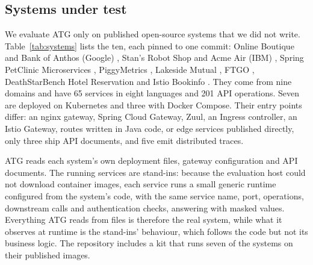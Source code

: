 \documentclass[conference]{IEEEtran}
\begin{document}
\subsection{Systems under test}
We evaluate ATG only on published open-source systems that we did not write. Table~\ref{tab:systems} lists the ten, each pinned to one commit: Online Boutique and Bank of Anthos (Google) \cite{boutique,anthos}, Stan's Robot Shop and Acme Air (IBM) \cite{robotshop,acmeair}, Spring PetClinic Microservices \cite{petclinic}, PiggyMetrics \cite{piggymetrics}, Lakeside Mutual \cite{lakeside}, FTGO \cite{ftgo}, DeathStarBench Hotel Reservation \cite{deathstarbench} and Istio Bookinfo \cite{bookinfo}. They come from nine domains and have 65 services in eight languages and 201 API operations. Seven are deployed on Kubernetes and three with Docker Compose. Their entry points differ: an nginx gateway, Spring Cloud Gateway, Zuul, an Ingress controller, an Istio Gateway, routes written in Java code, or edge services published directly, only three ship API documents, and five emit distributed traces.

ATG reads each system's own deployment files, gateway configuration and API documents. The running services are stand-ins: because the evaluation host could not download container images, each service runs a small generic runtime configured from the system's code, with the same service name, port, operations, downstream calls and authentication checks, answering with masked values. Everything ATG reads from files is therefore the real system, while what it observes at runtime is the stand-ins' behaviour, which follows the code but not its business logic. The repository includes a kit that runs seven of the systems on their published images.
\end{document}

